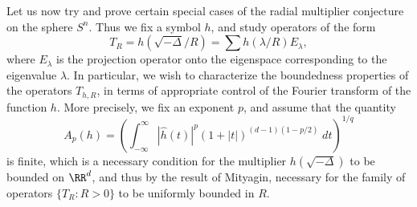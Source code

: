 Let us now try and prove certain special cases of the radial multiplier conjecture on the sphere $S^n$. Thus we fix a symbol $h$, and study operators of the form
%
\[ T_R = h \left( \sqrt{-\Delta} / R \right) = \sum h(\lambda / R) E_\lambda, \]
%
where $E_\lambda$ is the projection operator onto the eigenspace corresponding to the eigenvalue $\lambda$. In particular, we wish to characterize the boundedness properties of the operators $T_{h,R}$, in terms of appropriate control of the Fourier transform of the function $h$. More precisely, we fix an exponent $p$, and assume that the quantity
%
\[ A_p(h) = \left( \int_{-\infty}^\infty |\widehat{h}(t)|^p (1 + |t|)^{(d-1)(1 - p/2)}\; dt \right)^{1/q} \]
%
is finite, which is a necessary condition for the multiplier $h(\sqrt{-\Delta})$ to be bounded on $\RR^d$, and thus by the result of Mityagin, necessary for the family of operators $\{ T_R : R > 0 \}$ to be uniformly bounded in $R$.

